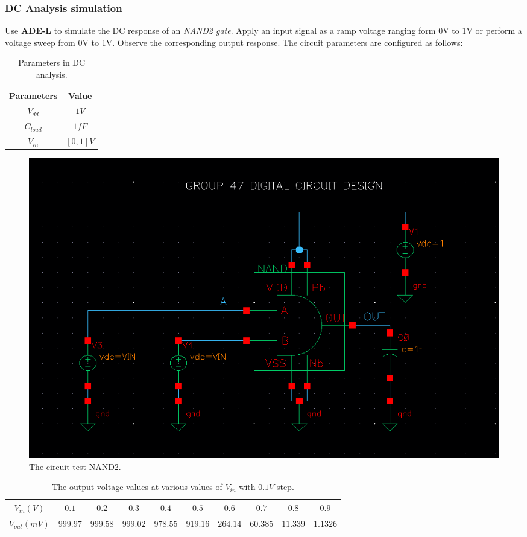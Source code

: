 \subsubsection{DC Analysis simulation}

Use \textbf{ADE-L} to simulate the DC response of an \textit{NAND2 gate}. Apply an input signal as a ramp voltage ranging form 0V to 1V or perform a voltage sweep from 0V to 1V. Observe the corresponding output response. The circuit parameters are configured as follows:

\begin{table}[H]
	\centering
	\begin{tabular}{|c|c|}
		\hline
		Parameters & Value \\
		\hline
		$V_{dd}$ & $1V$ \\
		\hline
		$C_{load}$ & $1fF$\\
		\hline
		$V_{in}$ & $[0, 1] V$\\
		\hline
	\end{tabular}
	\caption{Parameters in DC analysis.}
\end{table}

\begin{figure}[H]
	\centering
	\includegraphics[width=.6\linewidth]{section/EX1/NAND/EX1_NAND2_DCanalysis_schematic.png}
	\caption{The circuit test NAND2.}
\end{figure}

\begin{table}[H]
	\centering
	\begin{tabular}{|c|c|c|c|c|c|c|c|c|c|}
		\hline
		$V_{in}(V)$ & $0.1$ & $0.2$ & $0.3$ & $0.4$ & $0.5$ & $0.6$ & $0.7$ & $0.8$ & $0.9$ \\
		\hline
		$V_{out}(mV)$ & $999.97$ & $999.58$ & $999.02$ & $978.55$ & $919.16$ & $264.14$ & $60.385$ & $11.339$ & $1.1326$ \\
		\hline
	\end{tabular}
	\caption{The output voltage values at various values of $V_{in}$ with $0.1V$ step.}
\end{table}

